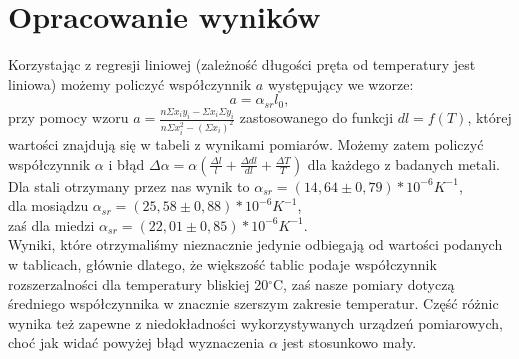 \documentclass[10pt,a4paper]{article}
\newcommand{\forceindent}{\leavevmode{\parindent=3em\indent}}
\begin{document}
\section{Opracowanie wyników}
\forceindent Korzystając z regresji liniowej (zależność długości pręta od temperatury jest liniowa) możemy policzyć współczynnik $a$ występujący we wzorze:
\begin{equation}
a = \alpha_{sr} l_{0},
\end{equation}
przy pomocy wzoru $a=\frac{n\Sigma x_i y_i - \Sigma x_i \Sigma y_i}{n\Sigma x_i^2 - (\Sigma x_i)^2}$ zastosowanego do funkcji $dl = f(T)$, której wartości znajdują się w tabeli z wynikami pomiarów.
Możemy zatem policzyć współczynnik $\alpha$  i błąd $\Delta\alpha = \alpha(\frac{\Delta l}{l} + \frac{\Delta dl}{dl} + \frac{\Delta T}{T})$ dla każdego z badanych metali.\\
Dla stali otrzymany przez nas wynik to $\alpha_{sr}=(14,64 \pm 0,79)*10^{-6} K^{-1}$,\\
dla mosiądzu $\alpha_{sr}=(25,58 \pm 0,88)*10^{-6} K^{-1}$,\\
zaś dla miedzi $\alpha_{sr}=(22,01 \pm 0,85)*10^{-6} K^{-1}$.\\
\newline \forceindent Wyniki, które otrzymaliśmy nieznacznie jedynie odbiegają od wartości podanych w tablicach, głównie dlatego, że większość tablic podaje współczynnik 
rozszerzalności dla temperatury bliskiej 20$^{\circ}$C, zaś nasze pomiary dotyczą średniego współczynnika w znacznie szerszym zakresie temperatur.
Część różnic wynika też zapewne z niedokładności wykorzystywanych urządzeń pomiarowych, choć jak widać powyżej błąd wyznaczenia $\alpha$ jest stosunkowo mały.\\
\end{document}
